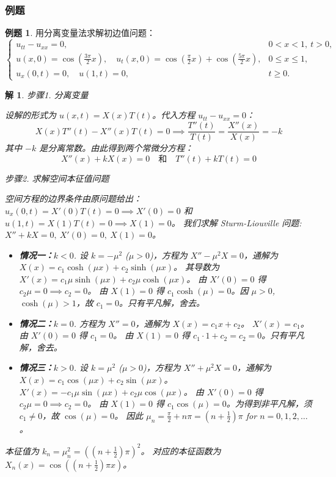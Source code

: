\documentclass[a4paper, 12pt, oneside]{article} %
\numberwithin{subsection}{section}
\numberwithin{subsubsection}{subsection}
\theoremstyle{plain}
\newtheorem{solution}{解}[subsection]
\theoremstyle{definition}
\newtheorem{example}{例题}[subsection]
\theoremstyle{remark}
\begin{document}
		\subsubsection{例题}
		\begin{example}
			用分离变量法求解初边值问题：
			\[
			\begin{cases}
				u_{tt} - u_{xx} = 0, & 0 < x < 1, \ t > 0, \\
				u(x,0) = \cos\left(\frac{3\pi}{2}x\right), \quad u_t(x,0) = \cos\left(\frac{\pi}{2}x\right) + \cos\left(\frac{5\pi}{2}x\right), & 0 \leq x \leq 1, \\
				u_x(0,t) = 0, \quad u(1,t) = 0, & t \geq 0.
			\end{cases}
			\]
		\end{example}
		\begin{solution}
			步骤1. 分离变量
			
			\noindent
			设解的形式为 $u(x,t) = X(x)T(t)$。代入方程 $u_{tt} - u_{xx} = 0$：
			\[ X(x)T''(t) - X''(x)T(t) = 0 \implies \frac{T''(t)}{T(t)} = \frac{X''(x)}{X(x)} = -k \]
			其中 $-k$ 是分离常数。由此得到两个常微分方程：
			\[ X''(x) + k X(x) = 0 \quad \text{和} \quad T''(t) + k T(t) = 0 \]
			
			步骤2. 求解空间本征值问题
			
			\noindent
			空间方程的边界条件由原问题给出：$u_x(0,t) = X'(0)T(t)=0 \implies X'(0)=0$ 和 $u(1,t)=X(1)T(t)=0 \implies X(1)=0$。
			我们求解 Sturm-Liouville 问题: $X'' + k X = 0, \ X'(0)=0, \ X(1)=0$。
			
			\begin{itemize}
				\item \textbf{情况一：$k < 0$}.
				设 $k = -\mu^2$ ($\mu>0$)，方程为 $X'' - \mu^2 X = 0$，通解为 $X(x) = c_1 \cosh(\mu x) + c_2 \sinh(\mu x)$。
				其导数为 $X'(x) = c_1\mu\sinh(\mu x) + c_2\mu\cosh(\mu x)$。
				由 $X'(0)=0$ 得 $c_2\mu=0 \implies c_2=0$。
				由 $X(1)=0$ 得 $c_1 \cosh(\mu) = 0$。因 $\mu>0$, $\cosh(\mu) > 1$，故 $c_1=0$。只有平凡解，舍去。
				
				\item \textbf{情况二：$k = 0$}.
				方程为 $X''=0$，通解为 $X(x) = c_1 x + c_2$。
				$X'(x) = c_1$。由 $X'(0)=0$ 得 $c_1=0$。
				由 $X(1)=0$ 得 $c_1 \cdot 1 + c_2 = c_2 = 0$。只有平凡解，舍去。
				
				\item \textbf{情况三：$k > 0$}.
				设 $k = \mu^2$ ($\mu>0$)，方程为 $X'' + \mu^2 X = 0$，通解为 $X(x) = c_1 \cos(\mu x) + c_2 \sin(\mu x)$。
				$X'(x) = -c_1\mu\sin(\mu x) + c_2\mu\cos(\mu x)$。
				由 $X'(0)=0$ 得 $c_2\mu=0 \implies c_2=0$。
				由 $X(1)=0$ 得 $c_1 \cos(\mu) = 0$。为得到非平凡解，须 $c_1 \neq 0$，故 $\cos(\mu)=0$。
				因此 $\mu_n = \frac{\pi}{2} + n\pi = (n+\frac{1}{2})\pi$ for $n=0, 1, 2, \dots$。
			\end{itemize}
			本征值为 $k_n = \mu_n^2 = ((n+\frac{1}{2})\pi)^2$。
			对应的本征函数为 $X_n(x) = \cos\left((n+\frac{1}{2})\pi x\right)$。
			

\end{solution}
\end{document}
